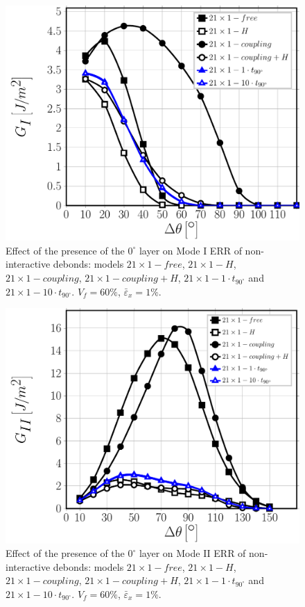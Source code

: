 \documentclass[review]{elsarticle}
\begin{document}
\begin{figure}[!htb]
\centering
\includegraphics[height=0.375\textheight]{nx1-1-vf60-GI.pdf}
\caption{Effect of the presence of the $0^{\circ}$ layer on Mode I ERR of non-interactive debonds: models $21\times 1-free$, $21\times 1-H$, $21\times 1-coupling$, $21\times 1-coupling+H$, $21\times 1-1\cdot t_{90^{\circ}}$ and $21\times 1-10\cdot t_{90^{\circ}}$. $V_{f}=60\%$, $\bar{\varepsilon}_{x}=1\%$.}\label{fig:debonddebondGI}
\end{figure}

\begin{figure}[!htb]
\centering
\includegraphics[height=0.375\textheight]{nx1-1-vf60-GII.pdf}
\caption{Effect of the presence of the $0^{\circ}$ layer on Mode II ERR of non-interactive debonds: models $21\times 1-free$, $21\times 1-H$, $21\times 1-coupling$, $21\times 1-coupling+H$, $21\times 1-1\cdot t_{90^{\circ}}$ and $21\times 1-10\cdot t_{90^{\circ}}$. $V_{f}=60\%$, $\bar{\varepsilon}_{x}=1\%$.}\label{fig:debonddebondGII}
\end{figure}
\end{document}
